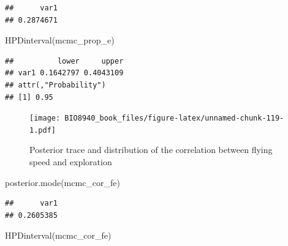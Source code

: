 \documentclass[
  12pt,
]{book}
\newenvironment{Shaded}{\begin{snugshade}}{\end{snugshade}}
\newcommand{\DecValTok}[1]{\textcolor[rgb]{0.00,0.00,0.81}{#1}}
\newcommand{\FunctionTok}[1]{\textcolor[rgb]{0.00,0.00,0.00}{#1}}
\newcommand{\NormalTok}[1]{#1}
\newcommand{\OtherTok}[1]{\textcolor[rgb]{0.56,0.35,0.01}{#1}}
\newcommand{\SpecialCharTok}[1]{\textcolor[rgb]{0.00,0.00,0.00}{#1}}
\begin{document}
\begin{verbatim}
##      var1 
## 0.2874671
\end{verbatim}

\begin{Shaded}
\begin{Highlighting}[]
\FunctionTok{HPDinterval}\NormalTok{(mcmc\_prop\_e)}
\end{Highlighting}
\end{Shaded}

\begin{verbatim}
##          lower     upper
## var1 0.1642797 0.4043109
## attr(,"Probability")
## [1] 0.95
\end{verbatim}

\begin{Shaded}
\end{Shaded}

\begin{figure}
\centering
\texttt{[image: BIO8940\_book\_files/figure-latex/unnamed-chunk-119-1.pdf]}
\caption{\label{fig:unnamed-chunk-119}Posterior trace and distribution of the correlation between flying speed and exploration}
\end{figure}

\begin{Shaded}
\begin{Highlighting}[]
\FunctionTok{posterior.mode}\NormalTok{(mcmc\_cor\_fe)}
\end{Highlighting}
\end{Shaded}

\begin{verbatim}
##      var1 
## 0.2605385
\end{verbatim}

\begin{Shaded}
\begin{Highlighting}[]
\FunctionTok{HPDinterval}\NormalTok{(mcmc\_cor\_fe)}
\end{Highlighting}
\end{Shaded}
\end{document}
